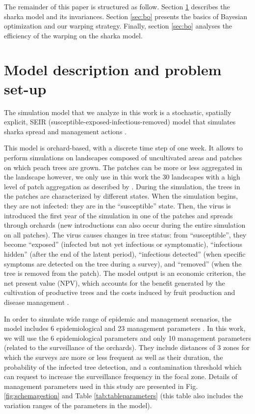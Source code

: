 The remainder of this paper is structured as follow. Section \ref{sec:model} describes the sharka model and its invariances.
Section \ref{sec:bo} presents the basics of Bayesian optimization and our warping strategy. Finally, section \ref{sec:bo}
analyses the efficiency of the warping on the sharka model.

\section{Model description and problem set-up}\label{sec:model}

The simulation model that we analyze in this work is a stochastic, spatially explicit, SEIR (susceptible-exposed-infectious-removed) model that simulates sharka spread and management actions 
\citep[including surveillance, removals and replantations][]{pleydell2018estimation,rimbaud2018using,rimbaud2018heuristic}.

This model is orchard-based, with a discrete time step of one week. It allows to perform simulations on landscapes composed of uncultivated areas and patches on which peach trees are grown. 
The patches can be more or less aggregated in the landscape however, we only use in this work the 30 landscapes with a high level of patch aggregation as described by \cite{picard2018}. 
During the simulation, the trees in the patches are characterized by different states. When the simulation begins, they are not infected: they are in the ``susceptible'' state. 
Then, the virus is introduced the first year of the simulation in one of the patches and spreads through orchards (new introductions can also occur during the entire simulation on all patches).
 The virus causes changes in tree status: from ``susceptible'', they become ``exposed'' (infected but not yet infectious or symptomatic), ``infectious hidden'' (after the end of the latent period), 
 ``infectious detected'' (when specific symptoms are detected on the tree during a survey), and ``removed'' (when the tree is removed from the patch). 
The model output is an economic criterion, the net present value (NPV), which accounts for the benefit generated by the cultivation of productive trees 
and the costs induced by fruit production and disease management \cite{rimbaud2018heuristic}.

In order to simulate wide range of epidemic and management scenarios, the model includes 6 epidemiological and 23 management parameters \cite{rimbaud2018heuristic,picard2018}. 
In this work, we will use the 6 epidemiological parameters and only 10 management parameters (related to the surveillance of the orchards). 
They include distances of 3 zones for which the surveys are more or less frequent as well as their duration, the probability of the infected tree detection, 
and a contamination threshold which can request to increase the surveillance frequency in the focal zone. 
Details of management parameters used in this study are presented in Fig.\ref{fig:schemagestion} and Table \ref{tab:tableparameters} 
(this table also includes the variation ranges of the parameters in the model).

